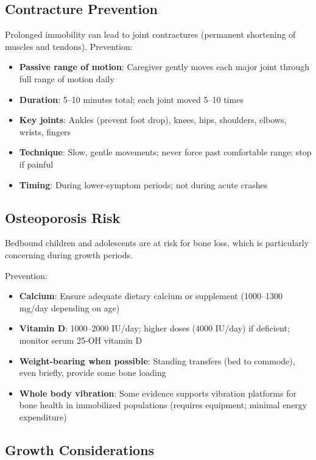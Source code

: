 \subsection{Contracture Prevention}

Prolonged immobility can lead to joint contractures (permanent shortening of muscles and tendons). Prevention:

\begin{itemize}
    \item \textbf{Passive range of motion}: Caregiver gently moves each major joint through full range of motion daily
    \item \textbf{Duration}: 5--10 minutes total; each joint moved 5--10 times
    \item \textbf{Key joints}: Ankles (prevent foot drop), knees, hips, shoulders, elbows, wrists, fingers
    \item \textbf{Technique}: Slow, gentle movements; never force past comfortable range; stop if painful
    \item \textbf{Timing}: During lower-symptom periods; not during acute crashes
\end{itemize}

\subsection{Osteoporosis Risk}

Bedbound children and adolescents are at risk for bone loss, which is particularly concerning during growth periods.

Prevention:
\begin{itemize}
    \item \textbf{Calcium}: Ensure adequate dietary calcium or supplement (1000--1300 mg/day depending on age)
    \item \textbf{Vitamin D}: 1000--2000 IU/day; higher doses (4000 IU/day) if deficient; monitor serum 25-OH vitamin D
    \item \textbf{Weight-bearing when possible}: Standing transfers (bed to commode), even briefly, provide some bone loading
    \item \textbf{Whole body vibration}: Some evidence supports vibration platforms for bone health in immobilized populations (requires equipment; minimal energy expenditure)
\end{itemize}

\subsection{Growth Considerations}

